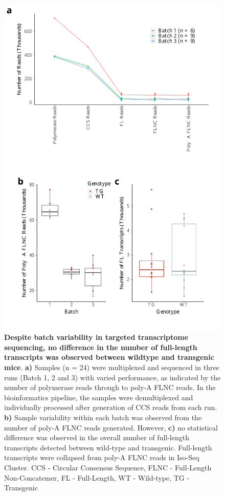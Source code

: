 \begin{figure}[!htp]
	\begin{center}
		\includegraphics[page=1,trim={0 1cm 0 0},clip,scale = 0.55]{Figures/TargetedTranscriptome.pdf}
	\end{center}
	\captionsetup{width=0.95\textwidth}
	\caption[Targeted Transcriptome Iso-seq run performance]%
	{\textbf{Despite batch variability in targeted transcriptome sequencing, no difference in the number of full-length transcripts was observed between wildtype and transgenic mice}. \textbf{a)} Samples (n = 24) were multiplexed and sequenced in three runs (Batch 1, 2 and 3) with varied performance, as indicated by the number of polymerase reads through to poly-A FLNC reads. In the bioinformatics pipeline, the samples were demultiplexed and individually processed after generation of CCS reads from each run. \textbf{b)} Sample variability within each batch was observed from the number of poly-A FLNC reads generated. However, \textbf{c)} no statistical difference was observed in the overall number of full-length transcripts detected between wild-type and transgenic. Full-length transcripts were collapsed from poly-A FLNC reads in Iso-Seq Cluster. CCS - Circular Consensus Sequence, FLNC - Full-Length Non-Concatemer, FL - Full-Length, WT - Wild-type, TG - Transgenic}
	\label{fig:isoseq_targeted_run_output}
\end{figure}

